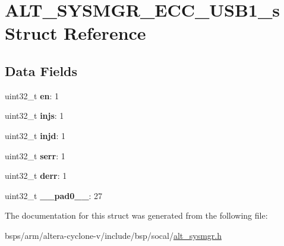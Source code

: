 \hypertarget{structALT__SYSMGR__ECC__USB1__s}{}\section{A\+L\+T\+\_\+\+S\+Y\+S\+M\+G\+R\+\_\+\+E\+C\+C\+\_\+\+U\+S\+B1\+\_\+s Struct Reference}
\label{structALT__SYSMGR__ECC__USB1__s}
\subsection*{Data Fields}
\begin{DoxyCompactItemize}
\item 
\mbox{\label{structALT__SYSMGR__ECC__USB1__s_a3aa52a9377dac2c31287f824ddb54b6d}} 
uint32\+\_\+t {\bfseries en}\+: 1
\item 
\mbox{\label{structALT__SYSMGR__ECC__USB1__s_a6fa6ea813c9a51864825e103a6759511}} 
uint32\+\_\+t {\bfseries injs}\+: 1
\item 
\mbox{\label{structALT__SYSMGR__ECC__USB1__s_a83bd970a4351b6d0f37e1c83de7ee1e5}} 
uint32\+\_\+t {\bfseries injd}\+: 1
\item 
\mbox{\label{structALT__SYSMGR__ECC__USB1__s_a898b70f93947d160d369054a0087c7d4}} 
uint32\+\_\+t {\bfseries serr}\+: 1
\item 
\mbox{\label{structALT__SYSMGR__ECC__USB1__s_a4367e20c26542648d9dc09cede2de7cb}} 
uint32\+\_\+t {\bfseries derr}\+: 1
\item 
\mbox{\label{structALT__SYSMGR__ECC__USB1__s_a3f7237b1c9c1c1722491e694557243a5}} 
uint32\+\_\+t {\bfseries \+\_\+\+\_\+pad0\+\_\+\+\_\+}\+: 27
\end{DoxyCompactItemize}


The documentation for this struct was generated from the following file\+:\begin{DoxyCompactItemize}
\item 
bsps/arm/altera-\/cyclone-\/v/include/bsp/socal/\mbox{\hyperlink{alt__sysmgr_8h}{alt\+\_\+sysmgr.\+h}}\end{DoxyCompactItemize}
